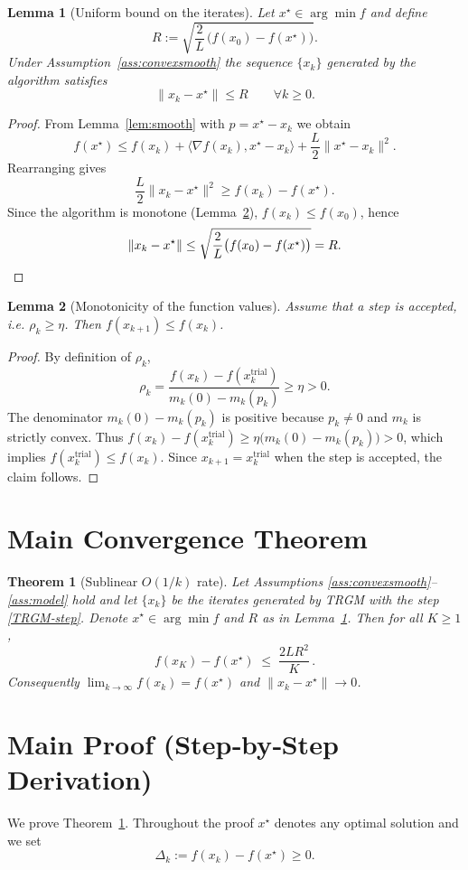 \documentclass{article}
\newtheorem{theorem}{Theorem}
\newtheorem{lemma}{Lemma}
\begin{document}
\begin{lemma}[Uniform bound on the iterates]\label{lem:uniformR}
Let $x^\star\in\arg\min f$ and define
\[
R:=\sqrt{\frac{2}{L}\,\bigl(f(x_0)-f(x^\star)\bigr)} .
\]
Under Assumption~\ref{ass:convexsmooth} the sequence $\{x_k\}$ generated by the algorithm satisfies
\[
\|x_k-x^\star\|\le R\qquad\forall k\ge0 .
\]
\end{lemma}
\begin{proof}
From Lemma~\ref{lem:smooth} with $p=x^\star-x_k$ we obtain
\[
f(x^\star)\le f(x_k)+\langle\nabla f(x_k),x^\star-x_k\rangle+\frac{L}{2}\|x^\star-x_k\|^{2}.
\]
Rearranging gives
\[
\frac{L}{2}\|x_k-x^\star\|^{2}\ge f(x_k)-f(x^\star).
\]
Since the algorithm is monotone (Lemma~\ref{lem:monotone}), $f(x_k)\le f(x_0)$, hence
\[
\|x_k-x^\star\|\le\sqrt{\frac{2}{L}\bigl(f(x_0)-f(x^\star)\bigr)}=R .
\qedhere
\]
\end{proof}

\begin{lemma}[Monotonicity of the function values]\label{lem:monotone}
Assume that a step is accepted, i.e. $\rho_k\ge\eta$.
Then $f(x_{k+1})\le f(x_k)$.
\end{lemma}
\begin{proof}
By definition of $\rho_k$,
\[
\rho_k=\frac{f(x_k)-f(x_k^{\text{trial}})}{m_k(0)-m_k(p_k)}\ge\eta>0 .
\]
The denominator $m_k(0)-m_k(p_k)$ is positive because $p_k\neq0$ and $m_k$ is strictly convex.
Thus $f(x_k)-f(x_k^{\text{trial}})\ge\eta\bigl(m_k(0)-m_k(p_k)\bigr)>0$,
which implies $f(x_k^{\text{trial}})\le f(x_k)$. Since $x_{k+1}=x_k^{\text{trial}}$ when the step is accepted, the claim follows. \qedhere
\end{proof}

\section*{Main Convergence Theorem}
\begin{theorem}[Sublinear $O(1/k)$ rate]\label{thm:rate}
Let Assumptions \ref{ass:convexsmooth}–\ref{ass:model} hold and let $\{x_k\}$ be the iterates generated by TRGM with the step \eqref{TRGM‑step}. Denote $x^\star\in\arg\min f$ and $R$ as in Lemma~\ref{lem:uniformR}. Then for all $K\ge1$,
\[
f(x_K)-f(x^\star)\;\le\;\frac{2L R^{2}}{K}\, .
\]
Consequently $\displaystyle\lim_{k\to\infty}f(x_k)=f(x^\star)$ and $\|x_k-x^\star\|\to0$.
\end{theorem}

\section*{Main Proof (Step‑by‑Step Derivation)}
We prove Theorem~\ref{thm:rate}. Throughout the proof $x^\star$ denotes any optimal solution and we set
\[
\Delta_k:=f(x_k)-f(x^\star)\ge0 .
\]
\end{document}
